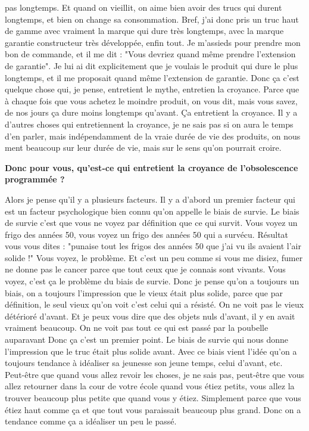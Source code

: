 \begin{small}
pas longtemps. Et quand on vieillit, on aime bien avoir des trucs qui durent longtemps, et bien on change sa consommation. 
Bref, j'ai donc pris un truc haut de gamme avec vraiment la marque qui dure très longtemps, avec la marque garantie constructeur très développée, enfin tout. Je m'assieds pour prendre mon bon de commande, et il me dit : "Vous devriez quand même prendre l'extension de garantie". Je lui ai dit explicitement que je voulais le produit qui dure le plus longtemps, et il me proposait quand même l'extension de garantie. Donc ça c'est quelque chose qui, je pense, entretient le mythe, entretien la croyance. Parce que à chaque fois que vous achetez le moindre produit, on vous dit, mais vous savez, de nos jours ça dure moins longtemps qu'avant. Ça entretient la croyance. Il y a d'autres choses qui entretiennent la croyance, je ne sais pas si on aura le temps d'en parler, mais indépendamment de la vraie durée de vie des produits, on nous ment beaucoup sur leur durée de vie, mais sur le sens qu'on pourrait croire.

\textbf{Donc pour vous, qu'est-ce qui entretient la croyance de l'obsolescence programmée ?}
\smallbreak


Alors je pense qu'il y a plusieurs facteurs. Il y a d'abord un premier facteur qui est un facteur psychologique bien connu qu'on appelle le biais de survie. Le biais de survie c'est que vous ne voyez par définition que ce qui survit. Vous voyez un frigo des années 50, vous voyez un frigo des années 50 qui a survécu. Résultat vous vous dites : "punaise tout les frigos des années 50 que j'ai vu ils avaient l'air solide !" Vous voyez, le problème. Et c'est un peu comme si vous me disiez, fumer ne donne pas le cancer parce que tout ceux que je connais sont vivants. Vous voyez, c'est ça le problème du biais de survie. Donc je pense qu'on a toujours un biais, on a toujours l'impression que le vieux était plus solide, parce que par définition, le seul vieux qu'on voit c'est celui qui a résisté. On ne voit pas le vieux détérioré d'avant. Et je peux vous dire que des objets nuls d'avant, il y en avait vraiment beaucoup. On ne voit pas tout ce qui est passé par la poubelle auparavant
Donc ça c'est un premier point. Le biais de survie qui nous donne l'impression que le truc était plus solide avant. Avec ce biais vient l'idée qu'on a toujours tendance à idéaliser sa jeunesse son jeune temps, celui d'avant, etc. Peut-être que quand vous allez revoir les choses, je ne sais pas, peut-être que vous allez retourner dans la cour de votre école quand vous étiez petits, vous allez la trouver beaucoup plus petite que quand vous y étiez. Simplement parce que vous étiez haut comme ça et que tout vous paraissait beaucoup plus grand. Donc on a tendance comme ça a idéaliser un peu le passé.


\end{small}
